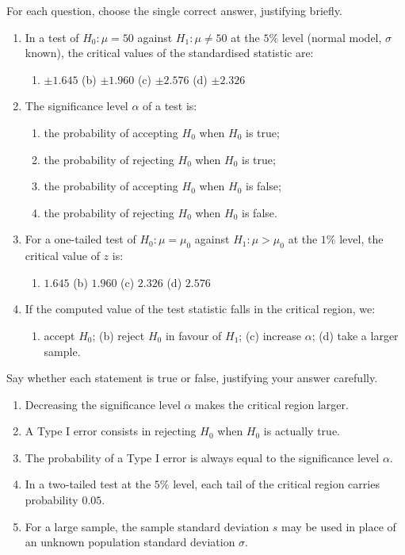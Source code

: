 \documentclass[11pt]{article}
\begin{document}
\begin{exercice}
For each question, choose the single correct answer, justifying briefly.
\begin{enumerate}
\item In a test of $H_0:\mu=50$ against $H_1:\mu\neq 50$ at the $5\%$ level (normal model, $\sigma$ known), the critical values of the standardised statistic are:
\begin{enumerate}
\item $\pm 1.645$ \quad (b) $\pm 1.960$ \quad (c) $\pm 2.576$ \quad (d) $\pm 2.326$
\end{enumerate}
\item The significance level $\alpha$ of a test is:
\begin{enumerate}
\item the probability of accepting $H_0$ when $H_0$ is true;
\item the probability of rejecting $H_0$ when $H_0$ is true;
\item the probability of accepting $H_0$ when $H_0$ is false;
\item the probability of rejecting $H_0$ when $H_0$ is false.
\end{enumerate}
\item For a one-tailed test of $H_0:\mu=\mu_0$ against $H_1:\mu>\mu_0$ at the $1\%$ level, the critical value of $z$ is:
\begin{enumerate}
\item $1.645$ \quad (b) $1.960$ \quad (c) $2.326$ \quad (d) $2.576$
\end{enumerate}
\item If the computed value of the test statistic falls in the critical region, we:
\begin{enumerate}
\item accept $H_0$; (b) reject $H_0$ in favour of $H_1$; (c) increase $\alpha$; (d) take a larger sample.
\end{enumerate}
\end{enumerate}
\end{exercice}

\begin{exercice}
Say whether each statement is true or false, justifying your answer carefully.
\begin{enumerate}
\item Decreasing the significance level $\alpha$ makes the critical region larger.
\item A Type I error consists in rejecting $H_0$ when $H_0$ is actually true.
\item The probability of a Type I error is always equal to the significance level $\alpha$.
\item In a two-tailed test at the $5\%$ level, each tail of the critical region carries probability $0.05$.
\item For a large sample, the sample standard deviation $s$ may be used in place of an unknown population standard deviation $\sigma$.
\end{enumerate}
\end{exercice}
\end{document}

